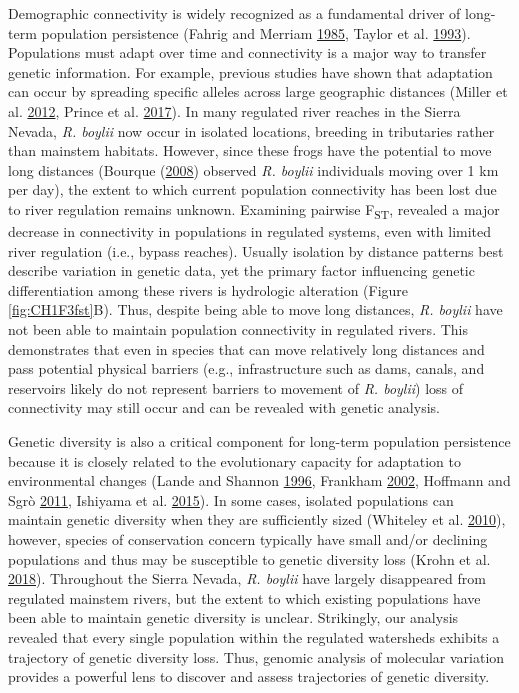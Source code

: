 \documentclass[proquest,12pt,final]{ucthesis-CA2012} %
\begin{document}
\begin{ucmainmatter}
Demographic connectivity is widely recognized as a fundamental driver of
long-term population persistence (Fahrig and Merriam
\protect\hyperlink{ref-fahrig_habitat_1985}{1985}, Taylor et al.
\protect\hyperlink{ref-taylor_connectivity_1993}{1993}). Populations
must adapt over time and connectivity is a major way to transfer genetic
information. For example, previous studies have shown that adaptation
can occur by spreading specific alleles across large geographic
distances (Miller et al.
\protect\hyperlink{ref-miller_conserved_2012}{2012}, Prince et al.
\protect\hyperlink{ref-prince_evolutionary_2017}{2017}). In many
regulated river reaches in the Sierra Nevada, \emph{R. boylii} now occur
in isolated locations, breeding in tributaries rather than mainstem
habitats. However, since these frogs have the potential to move long
distances (Bourque (\protect\hyperlink{ref-bourque_spatial_2008}{2008})
observed \emph{R. boylii} individuals moving over 1 km per day), the
extent to which current population connectivity has been lost due to
river regulation remains unknown. Examining pairwise
F\textsubscript{ST}, revealed a major decrease in connectivity in
populations in regulated systems, even with limited river regulation
(i.e., bypass reaches). Usually isolation by distance patterns best
describe variation in genetic data, yet the primary factor influencing
genetic differentiation among these rivers is hydrologic alteration
(Figure \ref{fig:CH1F3fst}B). Thus, despite being able to move long
distances, \emph{R. boylii} have not been able to maintain population
connectivity in regulated rivers. This demonstrates that even in species
that can move relatively long distances and pass potential physical
barriers (e.g., infrastructure such as dams, canals, and reservoirs
likely do not represent barriers to movement of \emph{R. boylii}) loss
of connectivity may still occur and can be revealed with genetic
analysis.

Genetic diversity is also a critical component for long-term population
persistence because it is closely related to the evolutionary capacity
for adaptation to environmental changes (Lande and Shannon
\protect\hyperlink{ref-lande_role_1996}{1996}, Frankham
\protect\hyperlink{ref-frankham_introduction_2002}{2002}, Hoffmann and
Sgrò \protect\hyperlink{ref-hoffmann_climate_2011}{2011}, Ishiyama et
al. \protect\hyperlink{ref-ishiyama_differential_2015}{2015}). In some
cases, isolated populations can maintain genetic diversity when they are
sufficiently sized (Whiteley et al.
\protect\hyperlink{ref-whiteley_genetic_2010}{2010}), however, species
of conservation concern typically have small and/or declining
populations and thus may be susceptible to genetic diversity loss (Krohn
et al. \protect\hyperlink{ref-krohn_conservation_2018}{2018}).
Throughout the Sierra Nevada, \emph{R. boylii} have largely disappeared
from regulated mainstem rivers, but the extent to which existing
populations have been able to maintain genetic diversity is unclear.
Strikingly, our analysis revealed that every single population within
the regulated watersheds exhibits a trajectory of genetic diversity
loss. Thus, genomic analysis of molecular variation provides a powerful
lens to discover and assess trajectories of genetic diversity.


\end{ucmainmatter}
\end{document}
